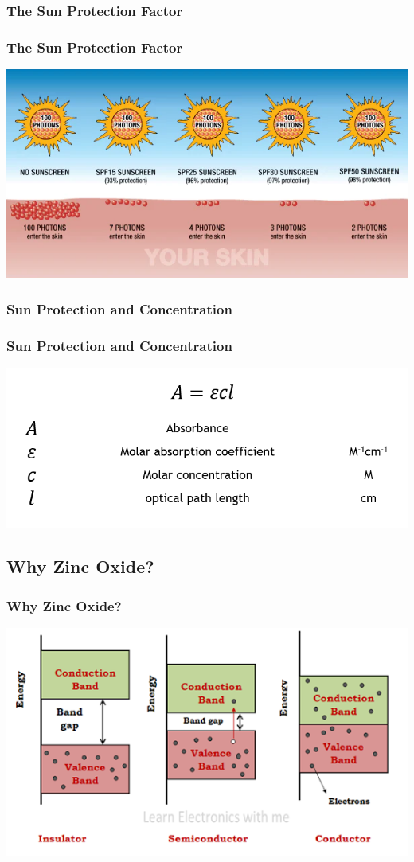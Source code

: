 \documentclass[10pt,aspectratio=169]{beamer} %
\begin{document}
\subsubsection{The Sun Protection Factor}
\begin{frame}\centering
  \frametitle{The Sun Protection Factor}
  \includegraphics[scale = 0.5]{SPF.png}
\end{frame}
\subsubsection{Sun Protection and Concentration}
\begin{frame}\centering
  \frametitle{Sun Protection and Concentration}
  \includegraphics[scale = 0.65]{beerlambert.png}
\end{frame}
\subsection{Why Zinc Oxide?}
\begin{frame}\centering
  \frametitle{Why Zinc Oxide?}
  \includegraphics[scale = 0.5]{bandgap.png}
\end{frame}
\end{document}
